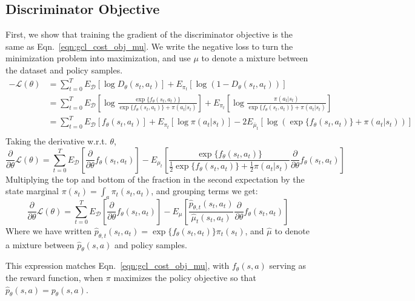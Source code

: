 \documentclass{article} \usepackage{iclr2018_conference,times}
\newcommand{\partheta}{\frac{\partial}{\partial\theta}}
\begin{document}
\subsection{Discriminator Objective}
First, we show that training the gradient of the discriminator objective is the same as Eqn.~\ref{eqn:gcl_cost_obj_mu}. We write the negative loss to turn the minimization problem into maximization, and use $\mu$ to denote a mixture between the dataset and policy samples.
\begin{align*}
-\mathcal{L}(\theta) &= \sum_{t=0}^T E_{\mathcal{D}}\left[\log D_\theta(s_t,a_t)\right] + E_{\pi_t}\left[\log(1-D_\theta(s_t,a_t))\right] \\
&= 
\sum_{t=0}^T E_{\mathcal{D}}\left[\log \frac{\exp\{ f_\theta(s_t,a_t)\}}{\exp\{f_\theta(s_t,a_t)\}+\pi(a_t|s_t)}\right] 
+ E_{\pi_t}\left[\log \frac{\pi(a_t|s_t)}{\exp\{f_\theta(s_t,a_t)\}+\pi(a_t|s_t)}\right] \\ 
&= \sum_{t=0}^T E_{\mathcal{D}}\left[f_\theta(s_t,a_t)\right] + E_{\pi_t}\left[\log \pi(a_t|s_t)\right] - 2E_{\bar{\mu}_t}\left[\log{(\exp\{f_\theta(s_t,a_t)\}+\pi(a_t|s_t))}\right] \\
\end{align*}
Taking the derivative w.r.t. $\theta$,
\[
\partheta\mathcal{L}(\theta)=
\sum_{t=0}^T E_{\mathcal{D}}\left[\partheta f_\theta(s_t,a_t)\right] 
-E_{\mu_t}\left[\frac{\exp\{f_\theta(s_t,a_t)\}}{\frac{1}{2}\exp\{f_\theta(s_t,a_t)\}+\frac{1}{2}\pi(a_t|s_t)}\partheta f_\theta(s_t,a_t)\right]
\]
Multiplying the top and bottom of the fraction in the second expectation by the state marginal $\pi(s_t) = \int_{a}\pi_t(s_t,a_t)$, and grouping terms we get:
\[
\partheta\mathcal{L}(\theta)=
\sum_{t=0}^T E_{\mathcal{D}}\left[\partheta f_\theta(s_t,a_t)\right] 
-E_{\mu}\left[\frac{\hat{p}_{\theta, t}(s_t,a_t)}{\hat{\mu}_t(s_t,a_t)}\partheta f_\theta(s_t,a_t)\right]
\]
Where we have written $\hat{p}_{\theta,t}(s_t,a_t) = \exp\{f_\theta(s_t,a_t)\}\pi_t(s_t)$, and $\hat{\mu}$ to denote a mixture between $\hat{p}_\theta(s,a)$ and policy samples.

This expression matches Eqn.~\ref{eqn:gcl_cost_obj_mu}, with $f_\theta(s,a)$ serving as the reward function, when $\pi$ maximizes the policy objective so that $\hat{p}_\theta(s,a) = p_\theta(s,a)$.
\end{document}
